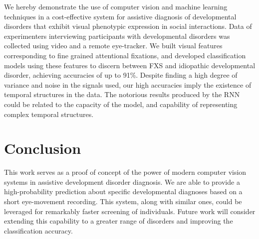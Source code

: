 \documentclass{llncs}
\begin{document}
We hereby demonstrate the use of computer vision and machine learning techniques in a cost-effective system for assistive diagnosis of developmental disorders that exhibit visual phenotypic expression in social interactions. Data of experimenters interviewing participants with developmental disorders was collected using video and a remote eye-tracker. We built visual features corresponding to fine grained attentional fixations, and developed classification models using these features to discern between FXS and idiopathic developmental disorder, achieving accuracies of up to 91\%. Despite finding a high degree of variance and noise in the signals used, our high accuracies imply the existence of temporal structures in the data. The notorious results produced by the RNN could be related to the capacity of the model, and capability of representing complex temporal structures.


  \vspace*{-\baselineskip}
  \section{Conclusion}
  \vspace*{-\baselineskip}

  This work serves as a proof of concept of the power of modern computer vision systems in assistive development disorder diagnosis. We are able to provide a high-probability prediction about specific developmental diagnoses based on a short eye-movement recording. This system, along with similar ones, could be leveraged for remarkably faster screening of individuals. Future work will consider extending this capability to a greater range of disorders and improving the classification accuracy.

  
  
\end{document}
